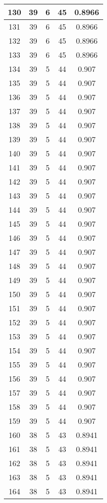 \documentclass[letterpaper, 12pt]{article}
\begin{document}
\begin{longtable}{|c|c|c|c|c|}
\hline
130 & 39 & 6 & 45 & 0.8966 \\
\hline
131 & 39 & 6 & 45 & 0.8966 \\
\hline
132 & 39 & 6 & 45 & 0.8966 \\
\hline
133 & 39 & 6 & 45 & 0.8966 \\
\hline
134 & 39 & 5 & 44 & 0.907 \\
\hline
135 & 39 & 5 & 44 & 0.907 \\
\hline
136 & 39 & 5 & 44 & 0.907 \\
\hline
137 & 39 & 5 & 44 & 0.907 \\
\hline
138 & 39 & 5 & 44 & 0.907 \\
\hline
139 & 39 & 5 & 44 & 0.907 \\
\hline
140 & 39 & 5 & 44 & 0.907 \\
\hline
141 & 39 & 5 & 44 & 0.907 \\
\hline
142 & 39 & 5 & 44 & 0.907 \\
\hline
143 & 39 & 5 & 44 & 0.907 \\
\hline
144 & 39 & 5 & 44 & 0.907 \\
\hline
145 & 39 & 5 & 44 & 0.907 \\
\hline
146 & 39 & 5 & 44 & 0.907 \\
\hline
147 & 39 & 5 & 44 & 0.907 \\
\hline
148 & 39 & 5 & 44 & 0.907 \\
\hline
149 & 39 & 5 & 44 & 0.907 \\
\hline
150 & 39 & 5 & 44 & 0.907 \\
\hline
151 & 39 & 5 & 44 & 0.907 \\
\hline
152 & 39 & 5 & 44 & 0.907 \\
\hline
153 & 39 & 5 & 44 & 0.907 \\
\hline
154 & 39 & 5 & 44 & 0.907 \\
\hline
155 & 39 & 5 & 44 & 0.907 \\
\hline
156 & 39 & 5 & 44 & 0.907 \\
\hline
157 & 39 & 5 & 44 & 0.907 \\
\hline
158 & 39 & 5 & 44 & 0.907 \\
\hline
159 & 39 & 5 & 44 & 0.907 \\
\hline
160 & 38 & 5 & 43 & 0.8941 \\
\hline
161 & 38 & 5 & 43 & 0.8941 \\
\hline
162 & 38 & 5 & 43 & 0.8941 \\
\hline
163 & 38 & 5 & 43 & 0.8941 \\
\hline
164 & 38 & 5 & 43 & 0.8941 \\

\end{longtable}
\end{document}
